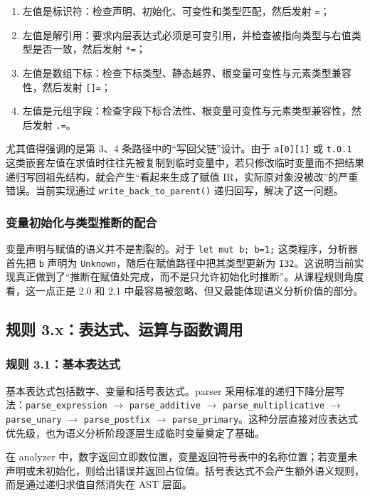 \documentclass[UTF8,a4paper,12pt]{ctexart}
\newcommand{\pkg}[1]{\texttt{#1}}
\newcommand{\op}[1]{\texttt{#1}}
\begin{document}
\begin{enumerate}[label=\arabic*.]
    \item 左值是标识符：检查声明、初始化、可变性和类型匹配，然后发射 \op{=}；
    \item 左值是解引用：要求内层表达式必须是可变引用，并检查被指向类型与右值类型是否一致，然后发射 \op{*=}；
    \item 左值是数组下标：检查下标类型、静态越界、根变量可变性与元素类型兼容性，然后发射 \op{[]=}；
    \item 左值是元组字段：检查字段下标合法性、根变量可变性与元素类型兼容性，然后发射 \op{.=}。
\end{enumerate}

尤其值得强调的是第 3、4 条路径中的“写回父链”设计。由于 \pkg{a[0][1]} 或 \pkg{t.0.1} 这类嵌套左值在求值时往往先被复制到临时变量中，若只修改临时变量而不把结果递归写回祖先结构，就会产生“看起来生成了赋值 IR，实际原对象没被改”的严重错误。当前实现通过 \pkg{write\_back\_to\_parent()} 递归回写，解决了这一问题。

\subsubsection{变量初始化与类型推断的配合}

变量声明与赋值的语义并不是割裂的。对于 \pkg{let mut b; b=1;} 这类程序，分析器首先把 \pkg{b} 声明为 \pkg{Unknown}，随后在赋值路径中把其类型更新为 \pkg{I32}。这说明当前实现真正做到了“推断在赋值处完成，而不是只允许初始化时推断”。从课程规则角度看，这一点正是 2.0 和 2.1 中最容易被忽略、但又最能体现语义分析价值的部分。

\subsection{规则 3.x：表达式、运算与函数调用}

\subsubsection{规则 3.1：基本表达式}

基本表达式包括数字、变量和括号表达式。parser 采用标准的递归下降分层写法：\pkg{parse\_expression} $\rightarrow$ \pkg{parse\_additive} $\rightarrow$ \pkg{parse\_multiplicative} $\rightarrow$ \pkg{parse\_unary} $\rightarrow$ \pkg{parse\_postfix} $\rightarrow$ \pkg{parse\_primary}。这种分层直接对应表达式优先级，也为语义分析阶段逐层生成临时变量奠定了基础。

在 analyzer 中，数字返回立即数位置，变量返回符号表中的名称位置；若变量未声明或未初始化，则给出错误并返回占位值。括号表达式不会产生额外语义规则，而是通过递归求值自然消失在 AST 层面。
\end{document}
